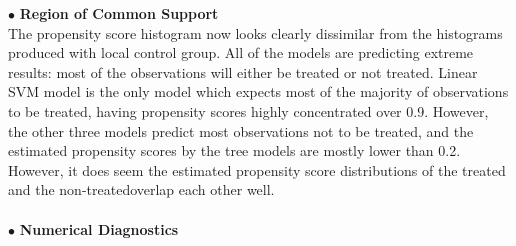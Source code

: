 \documentclass[11pt,a4paper,oneside]{article}
\begin{document}
$\bullet$ \textbf{Region of Common Support}\\
The propensity score histogram now looks clearly dissimilar from the histograms produced with local control group. All of the models are predicting extreme results: most of the observations will either be treated or not treated. Linear SVM model is the only model which expects most of the majority of observations to be treated, having propensity scores highly concentrated over 0.9. However, the other three models predict most observations not to be treated, and the estimated propensity scores by the tree models are mostly lower than 0.2. However, it does seem the estimated propensity score distributions of the treated and the non-treatedoverlap each other well.
\\\\
$\bullet$ \textbf{Numerical Diagnostics}\\
\end{document}
